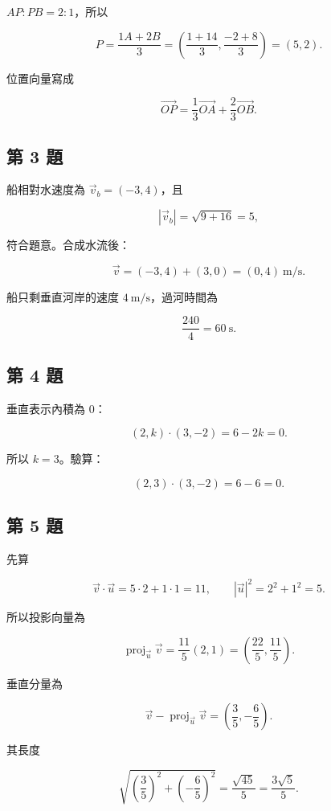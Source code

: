 \documentclass[11pt,a4paper]{article}
\begin{document}
\(AP:PB=2:1\)，所以

\[
P=\frac{1A+2B}{3}
=\left(
\frac{1+14}{3},
\frac{-2+8}{3}
\right)
=\boxed{(5,2)}.
\]

位置向量寫成

\[
\boxed{
\overrightarrow{OP}
=\frac13\overrightarrow{OA}
+\frac23\overrightarrow{OB}
}.
\]

\subsection{第 3 題}\label{ux7b2c-3-ux984c}

船相對水速度為 \(\vec v_b=(-3,4)\)，且

\[
|\vec v_b|=\sqrt{9+16}=5,
\]

符合題意。合成水流後：

\[
\vec v
=(-3,4)+(3,0)
=\boxed{(0,4)\ \mathrm{m/s}}.
\]

船只剩垂直河岸的速度 \(4\ \mathrm{m/s}\)，過河時間為

\[
\frac{240}{4}
=\boxed{60\ \mathrm s}.
\]

\subsection{第 4 題}\label{ux7b2c-4-ux984c}

垂直表示內積為 \(0\)：

\[
(2,k)\cdot(3,-2)
=6-2k=0.
\]

所以 \(\boxed{k=3}\)。驗算：

\[
(2,3)\cdot(3,-2)
=6-6=0.
\]

\subsection{第 5 題}\label{ux7b2c-5-ux984c}

先算

\[
\vec v\cdot\vec u
=5\cdot2+1\cdot1
=11,
\qquad
|\vec u|^2=2^2+1^2=5.
\]

所以投影向量為

\[
\operatorname{proj}_{\vec u}\vec v
=\frac{11}{5}(2,1)
=\boxed{\left(\frac{22}{5},\frac{11}{5}\right)}.
\]

垂直分量為

\[
\vec v-\operatorname{proj}_{\vec u}\vec v
=\left(\frac35,-\frac65\right).
\]

其長度

\[
\sqrt{\left(\frac35\right)^2+\left(-\frac65\right)^2}
=\frac{\sqrt{45}}5
=\boxed{\frac{3\sqrt5}{5}}.
\]
\end{document}

